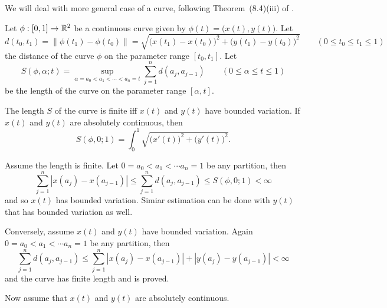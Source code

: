 \begin{enumerate}
We will deal with more general case of a curve, 
following Theorem~(8.4)(iii) of \cite{Saks37}.

\begin{llem}
Let \(\phi:[0,1]\to \mathbb{R}^2\) be a continuous curve given by 
\(\phi(t) = \bigl(x(t),y(t)\bigr)\).
Let
\begin{equation*}
d(t_0,t_1) = \|\phi(t_1) - \phi(t_0)\| = 
\sqrt{\bigl(x(t_1) - x(t_0)\bigr)^2 + \bigl(y(t_1) - y(t_0)\bigr)^2}
\qquad (0\leq t_0 \leq t_1 \leq 1)
\end{equation*}
the distance of the curve \(\phi\) on the parameter range \([t_0,t_1]\).
Let 
\begin{equation*}
S(\phi,\alpha;t) = \sup_{\alpha = a_0 < a_1 < \cdots < a_n = t}
                   \sum_{j=1}^n d(a_j,a_{j-1})
\qquad (0\leq \alpha \leq t \leq 1)
\end{equation*}
be the length of the curve on the parameter range \([\alpha,t]\).
\begin{itemize}
 The length $S$ of the curve is finite iff \(x(t)\) and \(y(t)\)
           have bounded variation.
 If  \(x(t)\) and \(y(t)\) are absolutely continuous, then
\begin{equation} \label{eq:7.20:Seq}
S(\phi,0;1) = \int_0^1 \sqrt{\bigl(x'(t)\bigr)^2 + \bigl(y'(t)\bigr)^2}.
\end{equation}
\end{itemize}
\end{llem}
\begin{thmproof}
Assume the length is finite.
Let \(0=a_0 < a_1 < \cdots a_n = 1\) be any partition, then
\begin{equation*}
\sum_{j=1}^n |x(a_j) - x(a_{j-1})|
\leq \sum_{j=1}^n d(a_j,a_{j-1}) \leq S(\phi,0;1) < \infty
\end{equation*}
and so \(x(t)\) has bounded variation.
Simiar estimation can be done with \(y(t)\) that  has bounded variation as well.

Conversely, assume  \(x(t)\) and \(y(t)\) have  bounded variation.
Again \(0=a_0 < a_1 < \cdots a_n = 1\) be any partition, then
\begin{equation*}
\sum_{j=1}^n d(a_j,a_{j-1}) 
\leq \sum_{j=1}^n |x(a_j) - x(a_{j-1})| + |y(a_j) - y(a_{j-1})| < \infty
\end{equation*}
and the curve has finite length and  is proved.

Now assume that  \(x(t)\) and \(y(t)\) are absolutely continuous.



\end{thmproof}
\end{enumerate}
